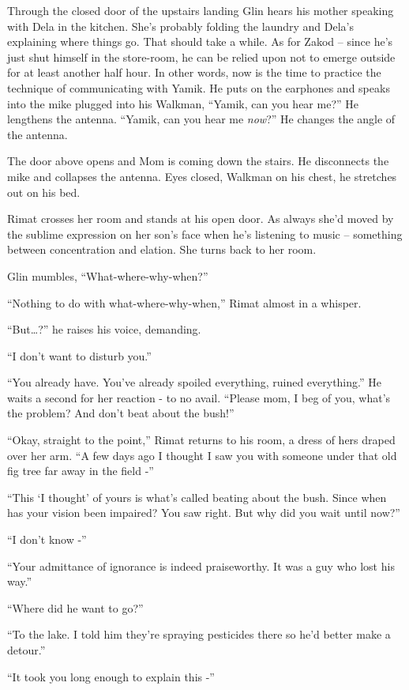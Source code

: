 \documentclass[twoside,11pt]{book}
\begin{document}
Through the closed door of the upstairs landing Glin hears his mother speaking with Dela in the kitchen. She's
probably folding the laundry and Dela's explaining where things go. That should take a while. As for Zakod -- since
he's just shut himself in the store-room, he can be relied upon not to emerge outside for at least another half
hour. In other words, now is the time to practice the technique of communicating with Yamik. He puts on the earphones
and speaks into the mike plugged into his Walkman, ``Yamik, can you hear me?'' He lengthens
the antenna. ``Yamik, can you hear me \textit{now}?'' He changes the angle of the antenna.

The door above opens and Mom is coming down the stairs. He disconnects the mike and collapses the
antenna. Eyes closed, Walkman on his chest, he stretches out on his bed.

Rimat crosses her room and stands at his open door. As always she'd moved by the sublime expression on her son's face
when he's listening to music -- something between concentration and elation. She turns back to her room.

Glin mumbles, ``What-where-why-when?''

``Nothing to do with what-where-why-when,'' Rimat almost in a whisper.

``But{\dots}?'' he raises his voice, demanding.

``I don't want to disturb you.''

``You already have. You've already spoiled everything, ruined everything.'' He waits a second
for her reaction - to no avail. ``Please mom, I beg of you, what's the problem? And don't beat about
the bush!''

``Okay, straight to the point,'' Rimat returns to his room, a dress of hers draped over her
arm. ``A few days ago I thought I saw you with someone under that old fig tree far away in the field
-''

``This `I thought' of yours is what's called beating about the bush. Since when has your vision been
impaired? You saw right. But why did you wait until now?''

``I don't know -''

``Your admittance of ignorance is indeed praiseworthy. It was a guy who lost his way.''

``Where did he want to go?''

``To the lake. I told him they're spraying pesticides there so he'd better make a detour.''

``It took you long enough to explain this -''
\end{document}
